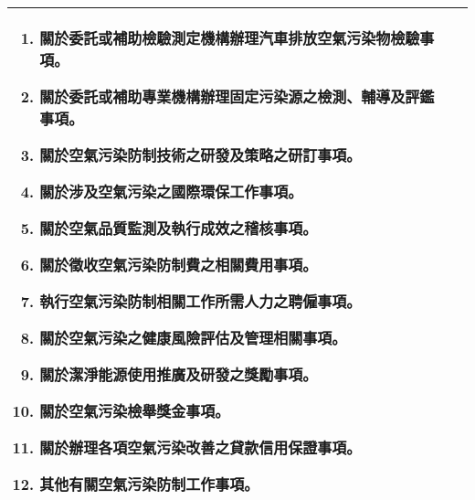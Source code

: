 \begin{table}[h]
\begin{tabular}{|p{7.5cm}|p{7.5cm}|}
\begin{enumerate}[label=\zhnum*、,topsep=0.5em, partopsep=0pt, itemsep=0pt, parsep=0pt,leftmargin=3em]
    \item  關於委託或補助檢驗測定機構辦理汽車排放空氣污染物檢驗事項。
    \item  關於委託或補助專業機構辦理固定污染源之檢測、輔導及評鑑事項。
    \item  關於空氣污染防制技術之研發及策略之研訂事項。
    \item  關於涉及空氣污染之國際環保工作事項。
    \item  關於空氣品質監測及執行成效之稽核事項。
    \item  關於徵收空氣污染防制費之相關費用事項。
    \item  執行空氣污染防制相關工作所需人力之聘僱事項。
    \item  關於空氣污染之健康風險評估及管理相關事項。
    \item  \textbf{關於潔淨能源使用推廣及研發之獎勵事項。}
    \item  關於空氣污染檢舉獎金事項。
    \item  關於辦理各項空氣污染改善之貸款信用保證事項。
    \item  其他有關空氣污染防制工作事項。
    \end{enumerate} \\
    \hline
    \end{tabular}
    \label{tab:01}
    \end{table}
  
  